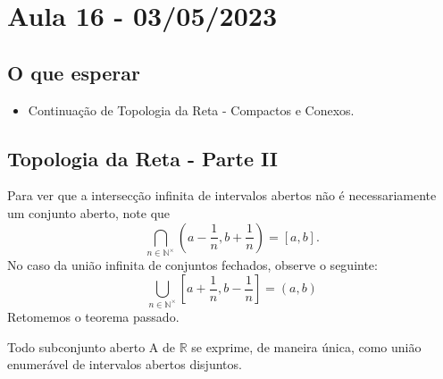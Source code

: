 \documentclass[Analysis/analysis_notes.tex]{subfiles}
\begin{document}
\section{Aula 16 - 03/05/2023}
\subsection{O que esperar}
\begin{itemize}
	\item Continua\c c\~ao de Topologia da Reta - Compactos e Conexos.
\end{itemize}
\subsection{Topologia da Reta - Parte II}
Para ver que a intersec\c c\~ao infinita de intervalos abertos n\~ao \'e necessariamente um conjunto aberto, note que
\[
	\bigcap_{n\in \mathbb{N}^{\times}}^{}{(a-\frac{1}{n}, b+\frac{1}{n})} = [a, b].
\]
No caso da uni\~ao infinita de conjuntos fechados, observe o seguinte:
$$
	\bigcup_{n\in \mathbb{N}^{\times}}^{}{[a+\frac{1}{n}, b - \frac{1}{n}]}=(a, b)
$$
Retomemos o teorema passado.
\begin{theorem*}
	Todo subconjunto aberto A de $\mathbb{R}$ se exprime, de maneira \'unica, como uni\~ao enumer\'avel de intervalos abertos disjuntos.
\end{theorem*}
\end{document}
